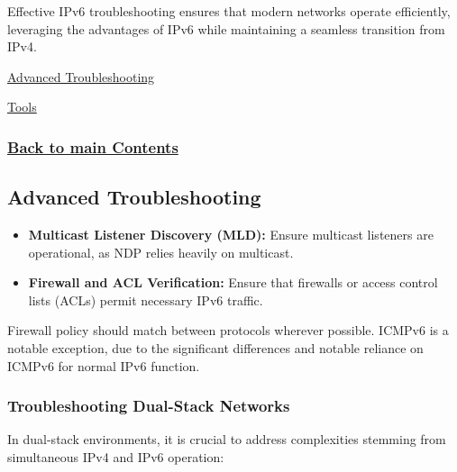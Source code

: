 \documentclass[
]{article}
\begin{document}
Effective IPv6 troubleshooting ensures that modern networks operate
efficiently, leveraging the advantages of IPv6 while maintaining a
seamless transition from IPv4.

\hyperref[advanced-troubleshooting]{Advanced Troubleshooting}

\hyperref[tools]{Tools}

\subsubsection{\texorpdfstring{\hyperref[list-of-contents]{Back to main
Contents}}{Back to main Contents}}\label{back-to-main-contents-8}

\pagebreak

\subsection{Advanced Troubleshooting}\label{advanced-troubleshooting}

\begin{itemize}
\item
  \textbf{Multicast Listener Discovery (MLD):} Ensure multicast
  listeners are operational, as NDP relies heavily on multicast.
\item
  \textbf{Firewall and ACL Verification:} Ensure that firewalls or
  access control lists (ACLs) permit necessary IPv6 traffic.
\end{itemize}

Firewall policy should match between protocols wherever possible. ICMPv6
is a notable exception, due to the significant differences and notable
reliance on ICMPv6 for normal IPv6 function.

\subsubsection{Troubleshooting Dual-Stack
Networks}\label{troubleshooting-dual-stack-networks}

In dual-stack environments, it is crucial to address complexities
stemming from simultaneous IPv4 and IPv6 operation:
\end{document}
